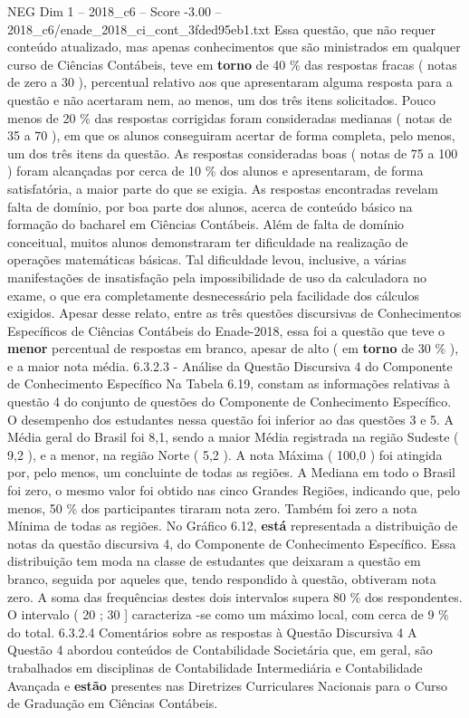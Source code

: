 \begin{textsample}{NEG Dim 1 – 2018\_c6 – Score -3.00 – 2018\_c6/enade\_2018\_ci\_cont\_3fded95eb1.txt}
Essa questão, que não requer conteúdo atualizado, mas apenas conhecimentos que são ministrados em qualquer curso de Ciências Contábeis, teve em \textbf{torno} de 40 \% das respostas fracas ( notas de zero a 30 ), percentual relativo aos que apresentaram alguma resposta para a questão e não acertaram nem, ao menos, um dos três itens solicitados.
Pouco menos de 20 \% das respostas corrigidas foram consideradas medianas ( notas de 35 a 70 ), em que os alunos conseguiram acertar de forma completa, pelo menos, um dos três itens da questão.
As respostas consideradas boas ( notas de 75 a 100 ) foram alcançadas por cerca de 10 \% dos alunos e apresentaram, de forma satisfatória, a maior parte do que se exigia.
As respostas encontradas revelam falta de domínio, por boa parte dos alunos, acerca de conteúdo básico na formação do bacharel em Ciências Contábeis.
Além de falta de domínio conceitual, muitos alunos demonstraram ter dificuldade na realização de operações matemáticas básicas.
Tal dificuldade levou, inclusive, a várias manifestações de insatisfação pela impossibilidade de uso da calculadora no exame, o que era completamente desnecessário pela facilidade dos cálculos exigidos.
Apesar desse relato, entre as três questões discursivas de Conhecimentos Específicos de Ciências Contábeis do Enade-2018, essa foi a questão que teve o \textbf{menor} percentual de respostas em branco, apesar de alto ( em \textbf{torno} de 30 \% ), e a maior nota média. 6.3.2.3 - Análise da Questão Discursiva 4 do Componente de Conhecimento Específico Na Tabela 6.19, constam as informações relativas à questão 4 do conjunto de questões do Componente de Conhecimento Específico.
O desempenho dos estudantes nessa questão foi inferior ao das questões 3 e 5.
A Média geral do Brasil foi 8,1, sendo a maior Média registrada na região Sudeste ( 9,2 ), e a menor, na região Norte ( 5,2 ).
A nota Máxima ( 100,0 ) foi atingida por, pelo menos, um concluinte de todas as regiões.
A Mediana em todo o Brasil foi zero, o mesmo valor foi obtido nas cinco Grandes Regiões, indicando que, pelo menos, 50 \% dos participantes tiraram nota zero.
Também foi zero a nota Mínima de todas as regiões.
No Gráfico 6.12, \textbf{está} representada a distribuição de notas da questão discursiva 4, do Componente de Conhecimento Específico.
Essa distribuição tem moda na classe de estudantes que deixaram a questão em branco, seguida por aqueles que, tendo respondido à questão, obtiveram nota zero.
A soma das frequências destes dois intervalos supera 80 \% dos respondentes.
O intervalo ( 20 ; 30 ] caracteriza -se como um máximo local, com cerca de 9 \% do total. 6.3.2.4 Comentários sobre as respostas à Questão Discursiva 4 A Questão 4 abordou conteúdos de Contabilidade Societária que, em geral, são trabalhados em disciplinas de Contabilidade Intermediária e Contabilidade Avançada e \textbf{estão} presentes nas Diretrizes Curriculares Nacionais para o Curso de Graduação em Ciências Contábeis.

\end{textsample}
